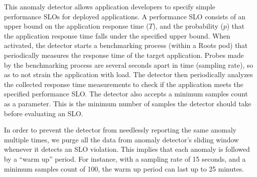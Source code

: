 This anomaly detector
allows application developers to specify simple performance SLOs for deployed applications. A
performance SLO consists of an upper bound on the application response time ($T$), and the probability ($p$)
that the application response time falls under the specified upper bound. 
When activated, the detector starts a benchmarking process (within a Roots pod)
that periodically measures the response time of the target application. Probes made by the benchmarking 
process are several seconds apart in time (sampling rate), so as to not strain the application with load.
The detector then periodically
analyzes the collected response time measurements to check if the application meets the specified performance
SLO. The detector also accepts a minimum samples count as a parameter. This is the minimum number of 
samples the detector should take before evaluating an SLO.



In order to prevent the detector from needlessly reporting the same anomaly multiple times,
we purge all the data from anomaly detector's sliding window whenever it detects an SLO violation.
This implies that each anomaly is followed by a ``warm up'' period.
For instance, with a sampling rate of 15 seconds, and a minimum
samples count of 100, the warm up period can last up to 25 minutes.

